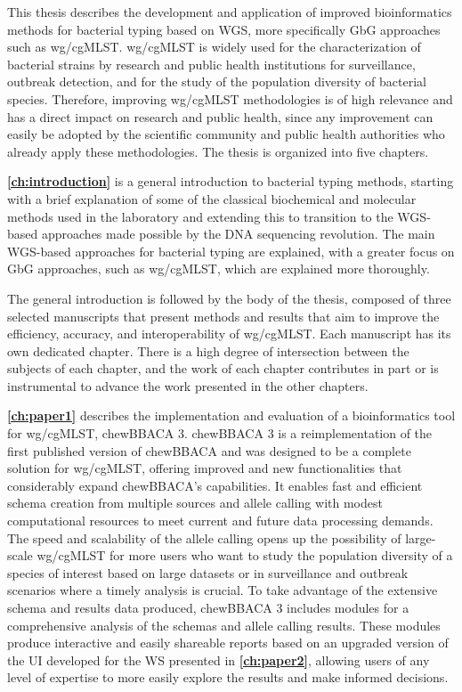 This thesis describes the development and application of improved bioinformatics methods for bacterial typing based on \ac{WGS}, more specifically \ac{GbG} approaches such as \ac{wg/cgMLST}. \ac{wg/cgMLST} is widely used for the characterization of bacterial strains by research and public health institutions for surveillance, outbreak detection, and for the study of the population diversity of bacterial species. Therefore, improving \ac{wg/cgMLST} methodologies is of high relevance and has a direct impact on research and public health, since any improvement can easily be adopted by the scientific community and public health authorities who already apply these methodologies. The thesis is organized into five chapters.

\textbf{\autoref{ch:introduction}} is a general introduction to bacterial typing methods, starting with a brief explanation of some of the classical biochemical and molecular methods used in the laboratory and extending this to transition to the \ac{WGS}-based approaches made possible by the DNA sequencing revolution. The main WGS-based approaches for bacterial typing are explained, with a greater focus on \ac{GbG} approaches, such as \ac{wg/cgMLST}, which are explained more thoroughly.

The general introduction is followed by the body of the thesis, composed of three selected manuscripts that present methods and results that aim to improve the efficiency, accuracy, and interoperability of \ac{wg/cgMLST}. Each manuscript has its own dedicated chapter. There is a high degree of intersection between the subjects of each chapter, and the work of each chapter contributes in part or is instrumental to advance the work presented in the other chapters.

\textbf{\autoref{ch:paper1}} describes the implementation and evaluation of a bioinformatics tool for \ac{wg/cgMLST}, chewBBACA 3. chewBBACA 3 is a reimplementation of the first published version of chewBBACA and was designed to be a complete solution for \ac{wg/cgMLST}, offering improved and new functionalities that considerably expand chewBBACA's capabilities. It enables fast and efficient schema creation from multiple sources and allele calling with modest computational resources to meet current and future data processing demands. The speed and scalability of the allele calling opens up the possibility of large-scale \ac{wg/cgMLST} for more users who want to study the population diversity of a species of interest based on large datasets or in surveillance and outbreak scenarios where a timely analysis is crucial. To take advantage of the extensive schema and results data produced, chewBBACA 3 includes modules for a comprehensive analysis of the schemas and allele calling results. These modules produce interactive and easily shareable reports based on an upgraded version of the \ac{UI} developed for the \ac{WS} presented in \textbf{\autoref{ch:paper2}}, allowing users of any level of expertise to more easily explore the results and make informed decisions.


